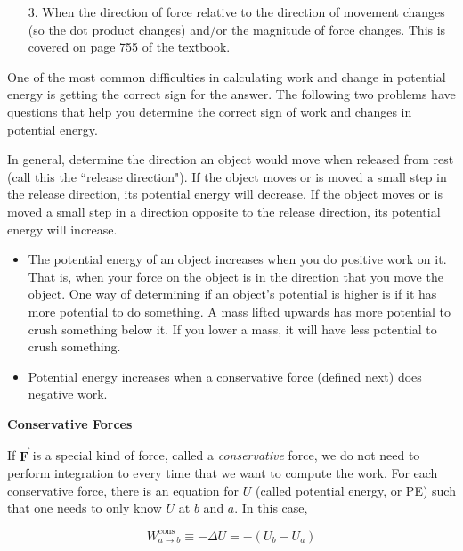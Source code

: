 \documentclass{article}
\newcommand{\bfvec}[1]{\vec{\mathbf{#1}}}
\begin{document}
\begin{enumerate}

  \item[3.] When the direction of force relative to the direction of movement changes (so the dot product changes) and/or the magnitude of force changes. This is covered on page 755 of the textbook.

\end{enumerate}

One of the most common difficulties in calculating work and change in potential energy is getting the correct sign for the answer. The following two problems have questions that help you determine the correct sign of work and changes in potential energy.

In general, determine the direction an object would move when released from rest (call this the ``release direction"). If the object moves or is moved a small step in the release direction, its potential energy will decrease. If the object moves or is moved a small step in a direction opposite to the release direction, its potential energy will increase.

\begin{itemize}

  \item The potential energy of an object increases when you do positive work on it. That is, when your force on the object is in the direction that you move the object. One way of determining if an object's potential is higher is if it has more potential to do something. A mass lifted upwards has more potential to crush something below it. If you lower a mass, it will have less potential to crush something.

  \item Potential energy increases when a conservative force (defined next) does negative work.

\end{itemize}

\textbf{Conservative Forces}

If $\bfvec{F}$ is a special kind of force, called a \emph{conservative} force, we do not need to perform integration to every time that we want to compute the work. For each conservative force, there is an equation for $U$ (called potential energy, or PE) such that one needs to only know $U$ at $b$ and $a$. In this case,

\begin{equation}
W_{a\rightarrow b}^{\text{cons}} \equiv -\Delta U = -(U_b-U_a)
\end{equation}
\end{document}
